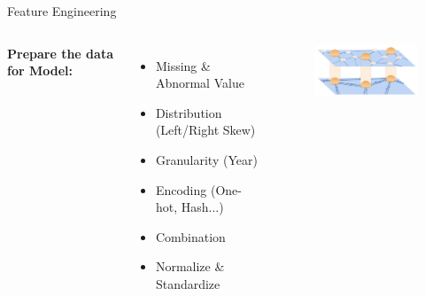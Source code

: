\documentclass{beamer}
\begin{document}
\begin{frame}{Feature Engineering}
\begin{columns}
    \textbf{Prepare the data for Model:}
    \bigskip
    \begin{itemize}
    \item Missing \& Abnormal Value
    \item Distribution (Left/Right Skew)
    \item Granularity (Year)
    \item Encoding (One-hot, Hash...)
    \item Combination
    \item Normalize \& Standardize
    \end{itemize}

	\begin{figure}
		\centering
		\includegraphics[width=5cm]{img/Feature_engineer.png}
	\end{figure}
\end{columns}
\end{frame}
\end{document}
